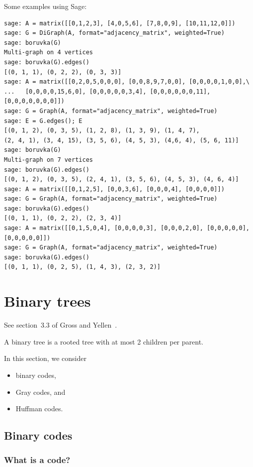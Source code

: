 Some examples using Sage:
%
\begin{lstlisting}
sage: A = matrix([[0,1,2,3], [4,0,5,6], [7,8,0,9], [10,11,12,0]])
sage: G = DiGraph(A, format="adjacency_matrix", weighted=True)
sage: boruvka(G)
Multi-graph on 4 vertices
sage: boruvka(G).edges()
[(0, 1, 1), (0, 2, 2), (0, 3, 3)]
sage: A = matrix([[0,2,0,5,0,0,0], [0,0,8,9,7,0,0], [0,0,0,0,1,0,0],\
...   [0,0,0,0,15,6,0], [0,0,0,0,0,3,4], [0,0,0,0,0,0,11], [0,0,0,0,0,0,0]])
sage: G = Graph(A, format="adjacency_matrix", weighted=True)
sage: E = G.edges(); E
[(0, 1, 2), (0, 3, 5), (1, 2, 8), (1, 3, 9), (1, 4, 7),
(2, 4, 1), (3, 4, 15), (3, 5, 6), (4, 5, 3), (4,6, 4), (5, 6, 11)]
sage: boruvka(G)
Multi-graph on 7 vertices
sage: boruvka(G).edges()
[(0, 1, 2), (0, 3, 5), (2, 4, 1), (3, 5, 6), (4, 5, 3), (4, 6, 4)]
sage: A = matrix([[0,1,2,5], [0,0,3,6], [0,0,0,4], [0,0,0,0]])
sage: G = Graph(A, format="adjacency_matrix", weighted=True)
sage: boruvka(G).edges()
[(0, 1, 1), (0, 2, 2), (2, 3, 4)]
sage: A = matrix([[0,1,5,0,4], [0,0,0,0,3], [0,0,0,2,0], [0,0,0,0,0], [0,0,0,0,0]])
sage: G = Graph(A, format="adjacency_matrix", weighted=True)
sage: boruvka(G).edges()
[(0, 1, 1), (0, 2, 5), (1, 4, 3), (2, 3, 2)]
\end{lstlisting}



\section{Binary trees}

See section~3.3 of Gross and Yellen~\cite{GrossYellen1999}.

A binary tree is a rooted tree with at most 2 children per parent.

In this section, we consider

\begin{itemize}
\item binary codes,

\item Gray codes, and

\item Huffman codes.
\end{itemize}

\subsection{Binary codes}


\subsubsection{What is a code?}

